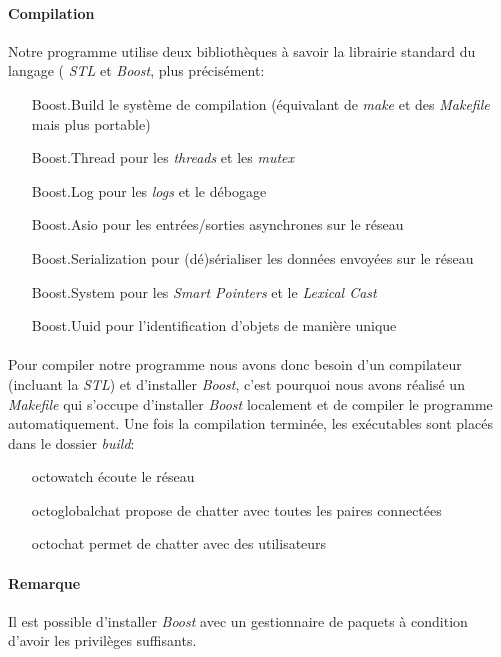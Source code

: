 \documentclass[a4paper]{article}
\begin{document}
			\paragraph{Compilation}{
			Notre programme utilise deux bibliothèques à savoir la librairie standard du langage ( \textit{STL} et \textit{Boost}, plus précisément:
			\begin{itemize}
				\item[Boost.Build] le système de compilation (équivalant de \textit{make} et des \textit{Makefile} mais plus portable)
				\item[Boost.Thread] pour les \textit{threads} et les \textit{mutex}
				\item[Boost.Log] pour les \textit{logs} et le débogage
				\item[Boost.Asio] pour les entrées/sorties asynchrones sur le réseau
				\item[Boost.Serialization] pour (dé)sérialiser les données envoyées sur le réseau
				\item[Boost.System] pour les \textit{Smart Pointers} et le \textit{Lexical Cast}
				\item[Boost.Uuid] pour l'identification d'objets de manière unique
			\end{itemize}
			}
			\paragraph{}{
			Pour compiler notre programme nous avons donc besoin d’un compilateur (incluant la \textit{STL})
			et d’installer \textit{Boost}, c’est pourquoi nous avons réalisé un \textit{Makefile} qui s’occupe
			d’installer \textit{Boost} localement et de compiler le programme automatiquement.
			Une fois la compilation terminée, les exécutables sont placés dans le dossier \textit{build}:
			\begin{itemize}
				\item[\textsf{octowatch}] écoute le réseau
				\item[\textsf{octoglobalchat}] propose de chatter avec toutes les paires connectées
				\item[\textsf{octochat}] permet de chatter avec des utilisateurs
			\end{itemize}

			}
			\paragraph{Remarque}{
				Il est possible d’installer \textit{Boost} avec un gestionnaire de paquets à condition d’avoir les privilèges suffisants.
			}
\end{document}
